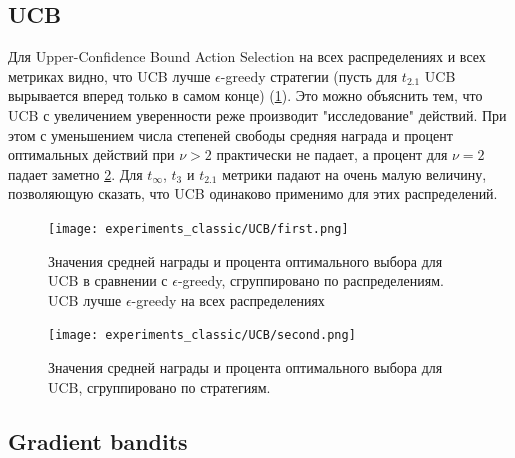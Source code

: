 \subsection{UCB}

Для Upper-Confidence Bound Action Selection на всех распределениях и всех метриках видно, что UCB лучше $\epsilon$-greedy стратегии (пусть для $t_{2.1}$ UCB вырывается вперед только в самом конце) (\ref{fig:ucb_1}). Это можно объяснить тем, что UCB с увеличением уверенности реже производит "исследование" действий. При этом с уменьшением числа степеней свободы средняя награда и процент оптимальных действий при $\nu > 2$ практически не падает, а процент для $\nu = 2$ падает заметно \ref{fig:ucb_2}. Для $t_{\infty}$, $t_3$ и $t_{2.1}$ метрики падают на очень малую величину, позволяющую сказать, что UCB одинаково применимо для этих распределений.
\begin{figure}[ht!]
    \centering
    \texttt{[image: experiments\_classic/UCB/first.png]}
    \caption{\label{fig:ucb_1}Значения средней награды и процента оптимального выбора для UCB в сравнении с $\epsilon$-greedy, сгруппировано по распределениям. UCB лучше $\epsilon$-greedy на всех распределениях}
\end{figure}
\begin{figure}[ht!]
    \centering
    \texttt{[image: experiments\_classic/UCB/second.png]}
    \caption{\label{fig:ucb_2}Значения средней награды и процента оптимального выбора для UCB, сгруппировано по стратегиям.}
\end{figure}

\subsection{Gradient bandits}

